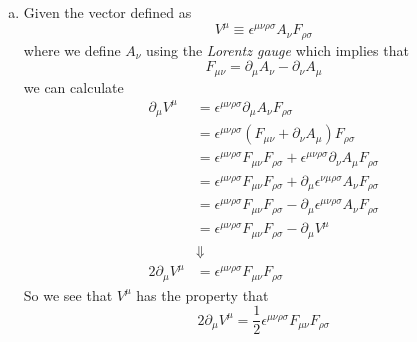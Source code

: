 \documentclass[11pt]{article}
\numberwithin{equation}{section}
\begin{document}
\begin{enumerate}[(a)]
\item
    Given the vector defined as
    \begin{equation}
        V^{\mu} \equiv \epsilon^{\mu\nu\rho\sigma}A_{\nu}F_{\rho\sigma}
        \label{VDef}
    \end{equation}
    where we define $A_{\nu}$ using the \emph{Lorentz gauge} which implies that
    \begin{equation}
        F_{\mu\nu} = \partial_{\mu}A_{\nu} - \partial_{\nu}A_{\mu}
        \label{Lor}
    \end{equation}
    we can calculate 
    \begin{align*}
        \partial_{\mu}V^{\mu} &= \epsilon^{\mu\nu\rho\sigma}\partial_{\mu}A_{\nu}F_{\rho\sigma}\\
                              &= \epsilon^{\mu\nu\rho\sigma}(F_{\mu\nu}+\partial_{\nu}A_{\mu})F_{\rho\sigma}\\
                              &= \epsilon^{\mu\nu\rho\sigma}F_{\mu\nu}F_{\rho\sigma} + \epsilon^{\mu\nu\rho\sigma}\partial_{\nu}A_{\mu}F_{\rho\sigma}\\
                              &= \epsilon^{\mu\nu\rho\sigma}F_{\mu\nu}F_{\rho\sigma} + \partial_{\mu}\epsilon^{\nu\mu\rho\sigma}A_{\nu}F_{\rho\sigma}\\
                              &= \epsilon^{\mu\nu\rho\sigma}F_{\mu\nu}F_{\rho\sigma} - \partial_{\mu}\epsilon^{\mu\nu\rho\sigma}A_{\nu}F_{\rho\sigma}\\
                              &= \epsilon^{\mu\nu\rho\sigma}F_{\mu\nu}F_{\rho\sigma} - \partial_{\mu}V^{\mu}\\
                              &\Downarrow\\
        2\partial_{\mu}V^{\mu} &= \epsilon^{\mu\nu\rho\sigma}F_{\mu\nu}F_{\rho\sigma}
    \end{align*}
    So we see that $V^{\mu}$ has the property that
    $$2\partial_{\mu}V^{\mu} = \frac{1}{2}\epsilon^{\mu\nu\rho\sigma}F_{\mu\nu}F_{\rho\sigma}$$
\end{enumerate}

\pagebreak
\end{document}
